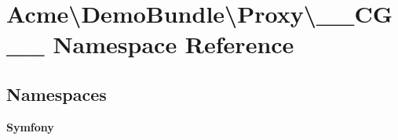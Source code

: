 \section{Acme\textbackslash{}Demo\+Bundle\textbackslash{}Proxy\textbackslash{}\+\_\+\+\_\+\+C\+G\+\_\+\+\_\+ Namespace Reference}
\label{namespace_acme_1_1_demo_bundle_1_1_proxy_1_1_____c_g____}
\subsection*{Namespaces}
\begin{DoxyCompactItemize}
\item 
 {\bf Symfony}
\end{DoxyCompactItemize}
